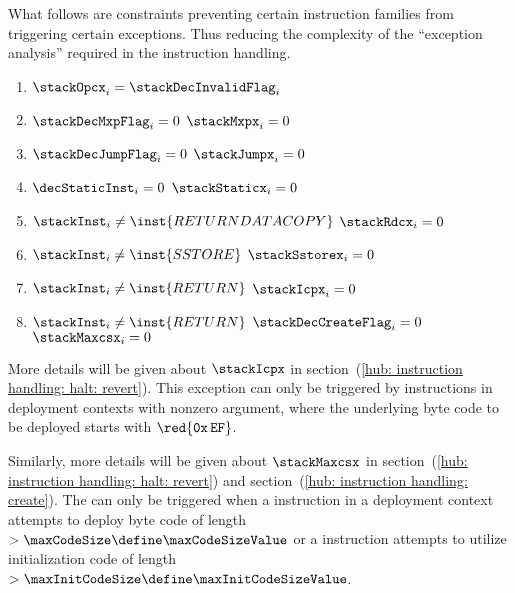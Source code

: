 \begin{center}
\end{center}
What follows are constraints preventing certain instruction families from triggering certain exceptions.
Thus reducing the complexity of the ``exception analysis'' required in the instruction handling.
\begin{enumerate}
	\item
		$\stackOpcx _{i} = \stackDecInvalidFlag _{i}$
	\item
		\If   $\stackDecMxpFlag _{i} = 0$
		\Then $\stackMxpx       _{i} = 0$
	\item
		\If   $\stackDecJumpFlag _{i} = 0$
		\Then $\stackJumpx       _{i} = 0$
	\item
		\If   $\decStaticInst _{i} = 0$
		\Then $\stackStaticx  _{i} = 0$
	\item
		\If   $\stackInst _{i} \neq \inst{RETURNDATACOPY}$
		\Then $\stackRdcx _{i} =    0$
	\item
		\If   $\stackInst    _{i} \neq \inst{SSTORE}$
		\Then $\stackSstorex _{i} =    0$
	\item
		\If   $\stackInst _{i} \neq \inst{RETURN}$
		\Then $\stackIcpx _{i} =    0$
	\item
		\If   $\stackInst   _{i} \neq \inst{RETURN}$ \et $\stackDecCreateFlag _{i} = 0$
		\Then $\stackMaxcsx _{i} =    0$
\end{enumerate}
\saNote{}
More details will be given about $\stackIcpx$ in section~(\ref{hub: instruction handling: halt: revert}).
This exception can only be triggered by  instructions in deployment contexts with nonzero  argument,
where the underlying byte code to be deployed starts with
$\red{\texttt{0x\,EF}}$.

\saNote{}
Similarly, more details will be given about $\stackMaxcsx$ in
section~(\ref{hub: instruction handling: halt: revert}) and
section~(\ref{hub: instruction handling: create}).
The \maxcsxSH{} can only be triggered when
a     instruction in a deployment context attempts to deploy byte code of length $> \maxCodeSize     \define \maxCodeSizeValue$ or
a  instruction attempts to utilize initialization code of length              $> \maxInitCodeSize \define \maxInitCodeSizeValue$.
